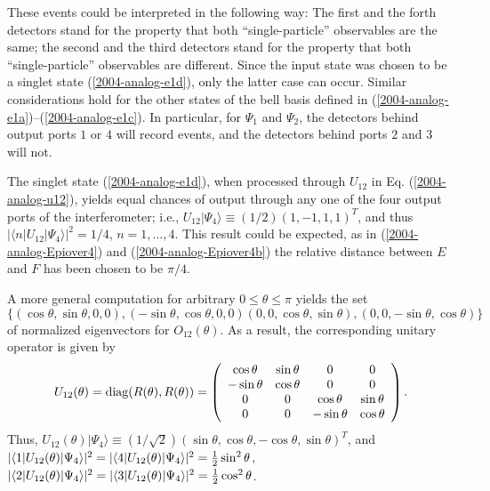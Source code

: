 \documentclass[pra,showpacs,showkeys,amsfonts]{revtex4}
\begin{document}
These events could be interpreted in the following way:
The first and the forth detectors stand for the property
that both ``single-particle'' observables are the same;
the second and the third detectors stand for the property
that both ``single-particle'' observables are  different.
Since the input state was chosen to be a singlet state (\ref{2004-analog-e1d}),
only the latter case can occur.
Similar considerations hold for the
other states of the bell basis defined in
(\ref{2004-analog-e1a})--(\ref{2004-analog-e1c}).
In particular, for $\Psi_1$ and $\Psi_2$,
the detectors behind output ports
$1$ or $4$ will record events, and the detectors behind ports $2$ and $3$
will not.


The singlet state (\ref{2004-analog-e1d}),
when processed through $U_{12}$ in Eq. (\ref{2004-analog-u12}),
yields equal chances of output
through any one of the four output ports of the interferometer; i.e.,
$U_{12}\vert \Psi_4\rangle \equiv (1/2)(1,-1,1,1)^T$,
and thus
$\vert \langle n \vert U_{12}\vert \Psi_4\rangle \vert^2 =1/4$,
$n=1,\ldots , 4$.
This result could be expected, as
in
(\ref{2004-analog-Epiover4})
and
(\ref{2004-analog-Epiover4b})
the relative distance between $E$ and $F$
has been chosen to be $\pi /4$.


A more general computation for arbitrary $0\le \theta \le \pi$
yields the  set
\[
\{
(\cos \theta , \sin \theta , 0, 0),
(-\sin \theta , \cos \theta , 0, 0)
(0, 0, \cos \theta , \sin \theta ),
(0, 0, -\sin \theta , \cos \theta )
\}
\]
of normalized eigenvectors for $O_{12}(\theta )$.
As a result, the corresponding unitary operator is given by
\begin{equation}
U_{12}(\theta ) =  {\rm diag}(R(\theta ),R(\theta)) =
\left(
\begin{array}{cccc}
\cos \theta & \sin \theta & 0& 0\\
-\sin \theta & \cos \theta & 0& 0\\
0& 0& \cos \theta & \sin \theta \\
0& 0& -\sin \theta & \cos \theta
\end{array}
\right)
.        \label{2004-analog-eunop12theta}
\end{equation}
Thus,
$U_{12}(\theta ) \vert \Psi_4\rangle \equiv  (1/\sqrt{2})
(\sin \theta ,\cos \theta ,-\cos \theta ,\sin \theta )^T$, and
$
\vert \langle 1 \vert U_{12}(\theta )\vert \Psi_4\rangle \vert^2 =
\vert \langle 4 \vert U_{12}(\theta )\vert \Psi_4\rangle \vert^2 =
{1\over 2}\sin^2 \theta$,
$
\vert \langle 2 \vert U_{12}(\theta )\vert \Psi_4\rangle \vert^2 =
\vert \langle 3 \vert U_{12}(\theta )\vert \Psi_4\rangle \vert^2 =
{1\over 2}\cos^2 \theta
$.
\end{document}
